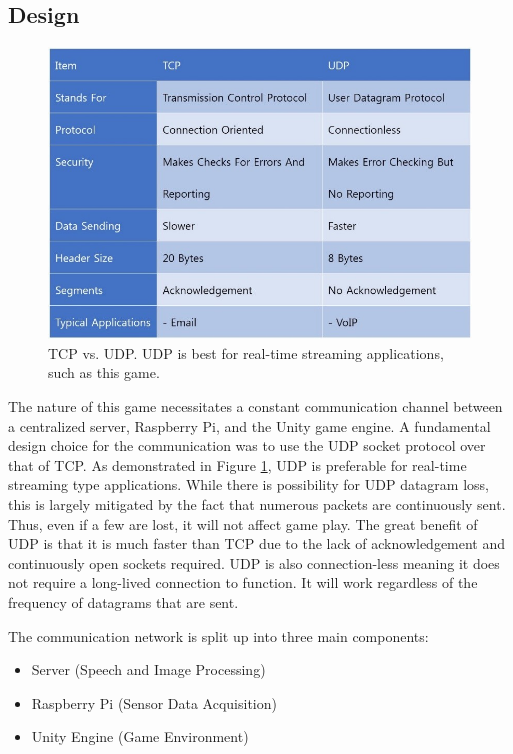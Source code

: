 \documentclass[titlepage, 12pt]{scrartcl}
\begin{document}
    \subsection{Design}
        \begin{figure}
            \centering
            \includegraphics[scale=1.2]{figures/udp_vs_tcp.jpg}
            \caption{TCP vs. UDP. UDP is best for real-time streaming applications, such as this game. \cite{meela_2017}}
            \label{fig:udp_vs_tcp}
        \end{figure}
        The nature of this game necessitates a constant communication channel between a centralized server, Raspberry Pi, and the Unity game engine. A fundamental design choice for the communication was to use the UDP socket protocol over that of TCP. As demonstrated in Figure \ref{fig:udp_vs_tcp}, UDP is preferable for real-time streaming type applications. While there is possibility for UDP datagram loss, this is largely mitigated by the fact that numerous packets are continuously sent. Thus, even if a few are lost, it will not affect game play. The great benefit of UDP is that it is much faster than TCP due to the lack of acknowledgement and continuously open sockets required. UDP is also connection-less meaning it does not require a long-lived connection to function. It will work regardless of the frequency of datagrams that are sent. \par
        The communication network is split up into three main components: 
        \begin{itemize}
            \item Server (Speech and Image Processing)
            \item Raspberry Pi (Sensor Data Acquisition)
            \item Unity Engine (Game Environment)
        \end{itemize} \par
\end{document}
